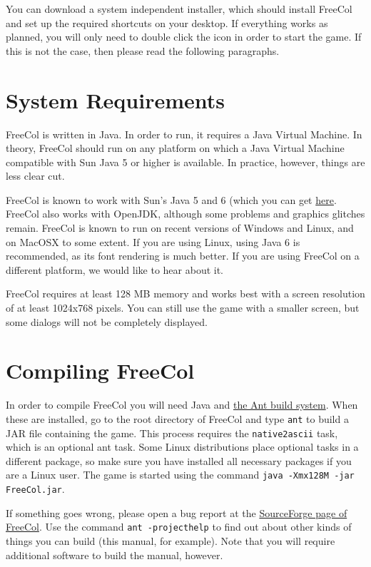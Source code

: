 \documentclass[12pt]{book}
\begin{document}
You can download a system independent installer, which should install
FreeCol and set up the required shortcuts on your desktop. If
everything works as planned, you will only need to double click the
icon in order to start the game. If this is not the case, then please
read the following paragraphs.

\hypertarget{System Requirements}{\section{System Requirements}}

FreeCol is written in Java. In order to run, it requires a Java
Virtual Machine. In theory, FreeCol should run on any platform on
which a Java Virtual Machine compatible with Sun Java 5 or higher is
available. In practice, however, things are less clear cut.

FreeCol is known to work with Sun's Java 5 and 6 (which you can get
\href{http://java.sun.com/}{here}. FreeCol also works with OpenJDK,
although some problems and graphics glitches remain. FreeCol is known
to run on recent versions of Windows and Linux, and on MacOSX to some
extent. If you are using Linux, using Java 6 is recommended, as its
font rendering is much better. If you are using FreeCol on a different
platform, we would like to hear about it.

FreeCol requires at least 128 MB memory and works best with a screen
resolution of at least 1024x768 pixels. You can still use the game
with a smaller screen, but some dialogs will not be completely
displayed.

\hypertarget{Compiling FreeCol}{\section{Compiling FreeCol}}

In order to compile FreeCol you will need Java and
\href{http://ant.apache.org/}{the Ant build system}. When these are
installed, go to the root directory of FreeCol and type \verb$ant$ to
build a JAR file containing the game. This process requires the
\verb$native2ascii$ task, which is an optional ant
task. Some Linux distributions place optional tasks in a different
package, so make sure you have installed all necessary packages if you
are a Linux user. The game is started using the command
\verb$java -Xmx128M -jar FreeCol.jar$.

If something goes wrong, please open a bug report at the
\href{http://sourceforge.net/projects/freecol}{SourceForge page of
  FreeCol}. Use the command \verb$ant -projecthelp$ to find out
about other kinds of things you can build (this manual, for
example). Note that you will require additional software to build the
manual, however.
\end{document}
